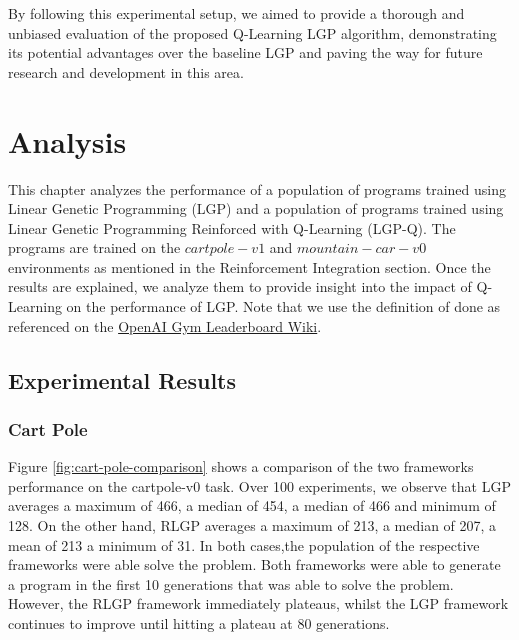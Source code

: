 \documentclass[12pt, final]{dalcsthesis}
\begin{document}
By following this experimental setup, we aimed to provide a thorough and unbiased evaluation of the proposed Q-Learning LGP algorithm, demonstrating its potential advantages over the baseline LGP and paving the way for future research and development in this area.

\chapter{Analysis}

This chapter analyzes the performance of a population of programs trained using Linear Genetic Programming (LGP)
and a population of programs trained using Linear Genetic Programming Reinforced with Q-Learning (LGP-Q). The programs
are trained on the $cartpole-v1$ and $mountain-car-v0$ environments \cite{1606.01540} as mentioned in the Reinforcement Integration section.
Once the results are explained, we analyze them to provide insight into the impact of Q-Learning on the performance of LGP. Note that we use the definition of done as referenced on the \href{https://github.com/openai/gym/wiki/Leaderboard}{OpenAI Gym Leaderboard Wiki}.

\section{Experimental Results}

\subsection{Cart Pole}

Figure \ref{fig:cart-pole-comparison} shows a comparison of the two frameworks performance on the cartpole-v0 task. Over 100 experiments, we observe that LGP averages a maximum of 466, a median of 454, a median of 466 and minimum of 128. On the other hand, RLGP
averages a maximum of 213, a median of 207, a mean of 213 a minimum of 31. In both cases,the population of the respective frameworks were able solve the problem. Both frameworks were able
to generate a program in the first 10 generations that was able to solve the problem. However, the RLGP framework immediately plateaus, whilst the LGP framework continues to improve until hitting a plateau at 80 generations.
\end{document}
